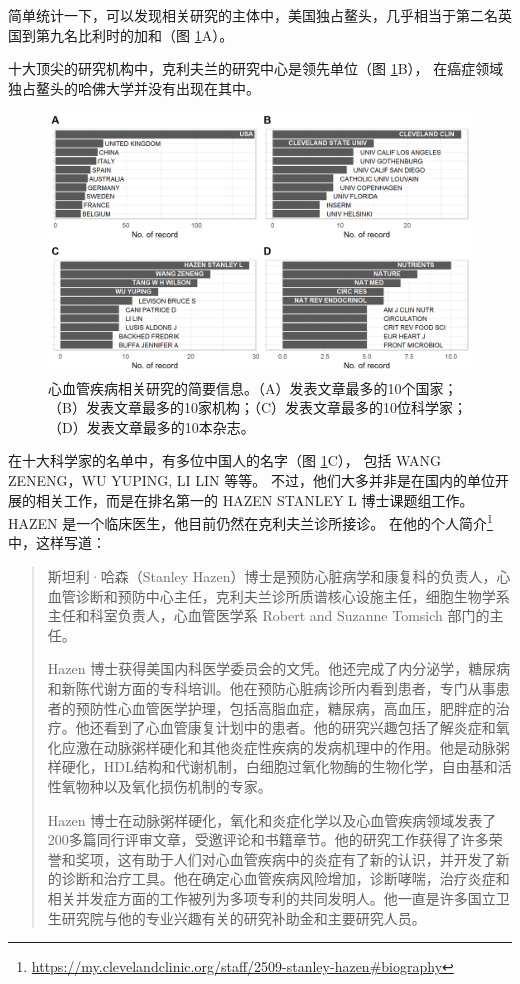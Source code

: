 \documentclass[]{ctexbook}
\renewcommand{\href}[2]{#2\footnote{\url{#1}}}
\begin{document}
\hypertarget{htmlwidget-65c512f9f23322aa9a8e}{}

简单统计一下，可以发现相关研究的主体中，美国独占鳌头，几乎相当于第二名英国到第九名比利时的加和（图 \ref{fig:cvd-four-dimension-barplot}A）。

十大顶尖的研究机构中，克利夫兰的研究中心是领先单位（图 \ref{fig:cvd-four-dimension-barplot}B），
在癌症领域独占鳌头的哈佛大学并没有出现在其中。

\begin{figure}
\includegraphics[width=1\linewidth]{plots/cvd-four-dimension-barplot-1} \caption{心血管疾病相关研究的简要信息。（A）发表文章最多的10个国家；（B）发表文章最多的10家机构；（C）发表文章最多的10位科学家；（D）发表文章最多的10本杂志。}\label{fig:cvd-four-dimension-barplot}
\end{figure}

在十大科学家的名单中，有多位中国人的名字（图 \ref{fig:cvd-four-dimension-barplot}C），
包括 WANG ZENENG，WU YUPING, LI LIN 等等。
不过，他们大多并非是在国内的单位开展的相关工作，而是在排名第一的 HAZEN STANLEY L 博士课题组工作。
HAZEN 是一个临床医生，他目前仍然在克利夫兰诊所接诊。
在他的\href{https://my.clevelandclinic.org/staff/2509-stanley-hazen\#biography}{个人简介}中，这样写道：

\begin{quote}
斯坦利·哈森（Stanley Hazen）博士是预防心脏病学和康复科的负责人，心血管诊断和预防中心主任，克利夫兰诊所质谱核心设施主任，细胞生物学系主任和科室负责人，心血管医学系 Robert and Suzanne Tomsich 部门的主任。

Hazen 博士获得美国内科医学委员会的文凭。他还完成了内分泌学，糖尿病和新陈代谢方面的专科培训。他在预防心脏病诊所内看到患者，专门从事患者的预防性心血管医学护理，包括高脂血症，糖尿病，高血压，肥胖症的治疗。他还看到了心血管康复计划中的患者。他的研究兴趣包括了解炎症和氧化应激在动脉粥样硬化和其他炎症性疾病的发病机理中的作用。他是动脉粥样硬化，HDL结构和代谢机制，白细胞过氧化物酶的生物化学，自由基和活性氧物种以及氧化损伤机制的专家。

Hazen 博士在动脉粥样硬化，氧化和炎症化学以及心血管疾病领域发表了200多篇同行评审文章，受邀评论和书籍章节。他的研究工作获得了许多荣誉和奖项，这有助于人们对心血管疾病中的炎症有了新的认识，并开发了新的诊断和治疗工具。他在确定心血管疾病风险增加，诊断哮喘，治疗炎症和相关并发症方面的工作被列为多项专利的共同发明人。他一直是许多国立卫生研究院与他的专业兴趣有关的研究补助金和主要研究人员。
\end{quote}
\end{document}
